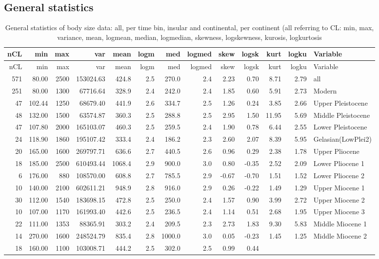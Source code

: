 \documentclass[]{article}
\begin{document}
\newpage

\subsection{General statistics}\label{general-statistics}

\begin{longtable}[]{@{}rrrrrrrrrrrrl@{}}
\caption{General statistics of body size data: all, per time bin,
insular and continental, per continent (all referring to CL: min, max,
variance, mean, logmean, median, logmedian, skewness, logskewness,
kurosis, logkurtosis}\tabularnewline
\toprule
nCL & min & max & var & mean & logm & med & logmed & skew & logsk & kurt
& logku & Variable\tabularnewline
\midrule
\endfirsthead
\toprule
nCL & min & max & var & mean & logm & med & logmed & skew & logsk & kurt
& logku & Variable\tabularnewline
\midrule
\endhead
571 & 80.00 & 2500 & 153024.63 & 424.8 & 2.5 & 270.0 & 2.4 & 2.23 & 0.70
& 8.71 & 2.79 & all\tabularnewline
251 & 80.00 & 1300 & 67716.64 & 328.9 & 2.4 & 242.0 & 2.4 & 1.85 & 0.60
& 5.91 & 2.73 & Modern\tabularnewline
47 & 102.44 & 1250 & 68679.40 & 441.9 & 2.6 & 334.7 & 2.5 & 1.26 & 0.24
& 3.85 & 2.66 & Upper Pleistocene\tabularnewline
48 & 132.00 & 1500 & 63574.87 & 360.3 & 2.5 & 288.8 & 2.5 & 2.95 & 1.50
& 11.95 & 5.69 & Middle Pleistocene\tabularnewline
47 & 107.80 & 2000 & 165103.07 & 460.3 & 2.5 & 259.5 & 2.4 & 1.90 & 0.78
& 6.44 & 2.55 & Lower Pleistocene\tabularnewline
24 & 118.90 & 1860 & 195107.42 & 333.4 & 2.4 & 186.2 & 2.3 & 2.60 & 2.07
& 8.39 & 5.95 & Gelasian(LowPlei2)\tabularnewline
20 & 165.00 & 1600 & 269797.71 & 636.6 & 2.7 & 440.5 & 2.6 & 0.96 & 0.29
& 2.38 & 1.78 & Upper Pliocene\tabularnewline
18 & 185.00 & 2500 & 610493.44 & 1068.4 & 2.9 & 900.0 & 3.0 & 0.80 &
-0.35 & 2.52 & 2.09 & Lower Pliocene 1\tabularnewline
6 & 176.00 & 880 & 108570.00 & 608.8 & 2.7 & 785.5 & 2.9 & -0.67 & -0.70
& 1.51 & 1.52 & Lower Pliocene 2\tabularnewline
10 & 140.00 & 2100 & 602611.21 & 948.9 & 2.8 & 916.0 & 2.9 & 0.26 &
-0.22 & 1.49 & 1.29 & Upper Miocene 1\tabularnewline
30 & 112.00 & 1540 & 183698.15 & 472.8 & 2.5 & 250.0 & 2.4 & 1.57 & 0.90
& 3.99 & 2.72 & Upper Miocene 2\tabularnewline
10 & 107.00 & 1170 & 161993.40 & 442.6 & 2.5 & 236.5 & 2.4 & 1.14 & 0.51
& 2.68 & 1.95 & Upper Miocene 3\tabularnewline
22 & 111.00 & 1353 & 88365.91 & 303.2 & 2.4 & 209.5 & 2.3 & 2.73 & 1.83
& 9.30 & 5.83 & Middle Miocene 1\tabularnewline
14 & 270.00 & 1600 & 248524.79 & 835.4 & 2.8 & 1000.0 & 3.0 & 0.05 &
-0.23 & 1.45 & 1.25 & Middle Miocene 2\tabularnewline
18 & 160.00 & 1100 & 103008.71 & 444.2 & 2.5 & 302.0 & 2.5 & 0.99 & 0.44

\end{longtable}
\end{document}
